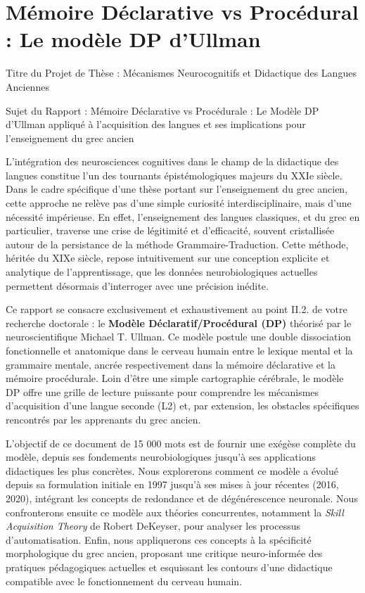 

\section{Mémoire Déclarative vs Procédural : Le modèle DP d'Ullman}

Titre du Projet de Thèse : Mécanismes Neurocognitifs et Didactique des Langues Anciennes

Sujet du Rapport : Mémoire Déclarative vs Procédurale : Le Modèle DP d'Ullman appliqué à
l'acquisition des langues et ses implications pour l'enseignement du grec ancien

L'intégration des neurosciences cognitives dans le champ de la didactique des langues constitue l'un
des tournants épistémologiques majeurs du XXIe siècle. Dans le cadre spécifique d'une thèse portant
sur l'enseignement du grec ancien, cette approche ne relève pas d'une simple curiosité
interdisciplinaire, mais d'une nécessité impérieuse. En effet, l'enseignement des langues
classiques, et du grec en particulier, traverse une crise de légitimité et d'efficacité, souvent
cristallisée autour de la persistance de la méthode \og Grammaire-Traduction\fg{}. Cette méthode,
héritée du XIXe siècle, repose intuitivement sur une conception explicite et analytique de
l'apprentissage, que les données neurobiologiques actuelles permettent désormais d'interroger avec
une précision inédite.

Ce rapport se consacre exclusivement et exhaustivement au point II.2.\cite{II-2-1-ref1} de votre
recherche doctorale : le \textbf{Modèle Déclaratif/Procédural (DP)} théorisé par le
neuroscientifique Michael T. Ullman. Ce modèle postule une double dissociation fonctionnelle et
anatomique dans le cerveau humain entre le lexique mental et la grammaire mentale, ancrée
respectivement dans la mémoire déclarative et la mémoire procédurale. Loin d'être une simple
cartographie cérébrale, le modèle DP offre une grille de lecture puissante pour comprendre les
mécanismes d'acquisition d'une langue seconde (L2) et, par extension, les obstacles spécifiques
rencontrés par les apprenants du grec ancien.

L'objectif de ce document de 15 000 mots est de fournir une exégèse complète du modèle, depuis ses
fondements neurobiologiques jusqu'à ses applications didactiques les plus concrètes. Nous
explorerons comment ce modèle a évolué depuis sa formulation initiale en 1997 jusqu'à ses mises à
jour récentes (2016, 2020), intégrant les concepts de redondance et de dégénérescence neuronale.
Nous confronterons ensuite ce modèle aux théories concurrentes, notamment la \textit{Skill
Acquisition Theory} de Robert DeKeyser, pour analyser les processus d'automatisation. Enfin, nous
appliquerons ces concepts à la spécificité morphologique du grec ancien, proposant une critique
neuro-informée des pratiques pédagogiques actuelles et esquissant les contours d'une didactique
compatible avec le fonctionnement du cerveau humain.



